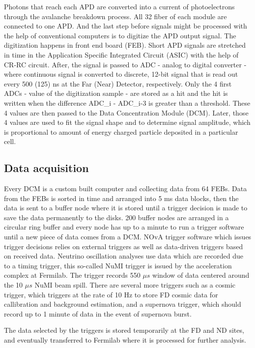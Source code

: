 Photons that reach each APD are converted into a current of photoelectrons through the avalanche breakdown 
process. All 32 fiber of each module are connected to one APD. And the last step before signals might be 
processed with the 
help of conventional computers is to digitize the APD output signal. The digitization happens in
front end board (FEB). Short APD signals are stretched in time in the Application Specific 
Integrated Circuit (ASIC) with the help of CR-RC circuit. After, the signal is passed to ADC - 
analog to digital converter - where continuous signal is converted to discrete, 12-bit signal
that is read out every 500 (125) ns at the Far (Near) Detector, respectively. Only the 4 first ADCs - 
value of the digitization sample - are stored as a hit and the hit is written when the difference
\be
ADC_i - ADC_{i-3}
\ee
is greater than a threshold. These 4 values are then passed to the Data Concentration Module (DCM). 
Later, those 4 values are used to fit the signal shape and to determine signal amplitude, which 
is proportional to amount of energy charged particle deposited in a particular cell.

\subsection{Data acquisition}
Every DCM is a custom built computer and collecting data from 64 FEBs. Data from the FEBs
is sorted in time and arranged into 5 ms data blocks, then the data is sent to a buffer node where it 
is stored until a trigger decision is made to save the data permanently to the disks. 200 buffer nodes 
are arranged in a circular ring buffer and every node has up to a minute to run a trigger software 
until a new piece of data comes from a DCM. NOvA trigger software which issues trigger decisions relies
on external triggers as well as data-driven triggers based on received data. Neutrino oscillation
analyses use data which are recorded due to a timing trigger, this so-called NuMI trigger 
is issued by the acceleration complex at Fermilab. The trigger records 550 $\mu s$ window of data centered 
around the 10 $\mu s$ NuMI beam spill. There are several more triggers such as a cosmic trigger, which 
triggers at the rate of 10 Hz to store FD cosmic data for callibration and background estimation, and a 
supernova trigger, which should record up to 1 minute of data in the event of supernova burst.

The data selected by the triggers is stored temporarily at the FD and ND sites, and eventually transferred
to Fermilab where it is processed for further analysis.

